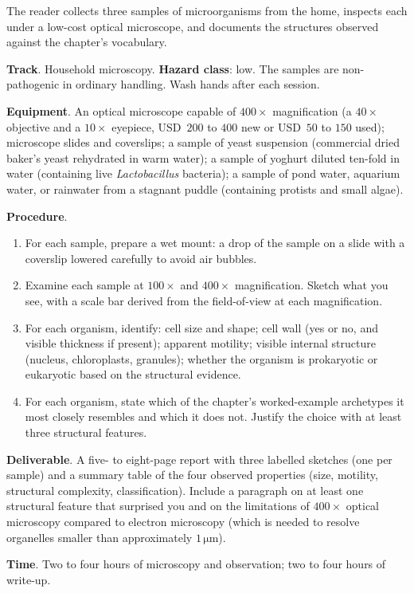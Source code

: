 \begin{project}
The reader collects three samples of microorganisms from the home,
inspects each under a low-cost optical microscope, and documents the
structures observed against the chapter's vocabulary.

\textbf{Track}. Household microscopy.
\textbf{Hazard class}: low. The samples are non-pathogenic in
ordinary handling. Wash hands after each session.

\textbf{Equipment}. An optical microscope capable of
$400\times$ magnification (a $40\times$ objective and a $10\times$
eyepiece, USD~$200$ to $400$ new or USD~$50$ to $150$ used);
microscope slides and coverslips; a sample of yeast suspension
(commercial dried baker's yeast rehydrated in warm water); a sample
of yoghurt diluted ten-fold in water (containing live
\emph{Lactobacillus} bacteria); a sample of pond water, aquarium
water, or rainwater from a stagnant puddle (containing protists and
small algae).

\textbf{Procedure}.

\begin{enumerate}[leftmargin=*]
\item For each sample, prepare a wet mount: a drop of the sample on a
  slide with a coverslip lowered carefully to avoid air bubbles.
\item Examine each sample at $100\times$ and $400\times$ magnification.
  Sketch what you see, with a scale bar derived from the field-of-view
  at each magnification.
\item For each organism, identify: cell size and shape; cell wall (yes
  or no, and visible thickness if present); apparent motility; visible
  internal structure (nucleus, chloroplasts, granules); whether the
  organism is prokaryotic or eukaryotic based on the structural
  evidence.
\item For each organism, state which of the chapter's worked-example
  archetypes it most closely resembles and which it does not. Justify
  the choice with at least three structural features.
\end{enumerate}

\textbf{Deliverable}. A five- to eight-page report with three labelled
sketches (one per sample) and a summary table of the four observed
properties (size, motility, structural complexity, classification).
Include a paragraph on at least one structural feature that surprised
you and on the limitations of $400\times$ optical microscopy compared
to electron microscopy (which is needed to resolve organelles smaller
than approximately $1\,\si{\micro\meter}$).

\textbf{Time}. Two to four hours of microscopy and observation; two
to four hours of write-up.
\end{project}

